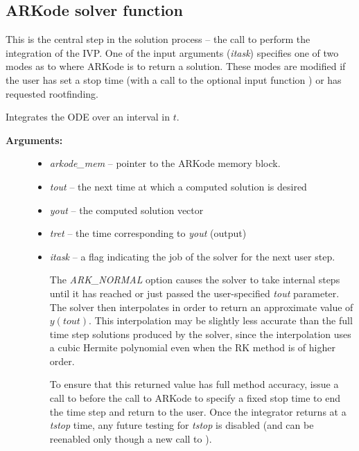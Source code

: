 \documentclass[letterpaper,10pt,english]{sphinxmanual}
\begin{document}
\subsection{ARKode solver function}
\label{c_interface/User_callable:arkode-solver-function}\label{c_interface/User_callable:cinterface-integration}
This is the central step in the solution process -- the call to perform
the integration of the IVP.  One of the input arguments (\emph{itask})
specifies one of two modes as to where ARKode is to return a
solution.  These modes are modified if the user has set a stop time
(with a call to the optional input function {\hyperref[c_interface/User_callable:c.ARKodeSetStopTime]{\emph{}}}) or
has requested rootfinding.

\begin{fulllineitems}
\label{c_interface/User_callable:c.ARKode}
Integrates the ODE over an interval in \(t\).
\begin{description}
\item[{\textbf{Arguments:}}] \leavevmode\begin{itemize}
\item {} 
\emph{arkode\_mem} -- pointer to the ARKode memory block.

\item {} 
\emph{tout} -- the next time at which a computed solution is desired

\item {} 
\emph{yout} -- the computed solution vector

\item {} 
\emph{tret} -- the time corresponding to \emph{yout} (output)

\item {} 
\emph{itask} -- a flag indicating the job of the solver for the next
user step.

The \emph{ARK\_NORMAL} option causes the solver to take internal steps
until it has reached or just passed the user-specified \emph{tout}
parameter. The solver then interpolates in order to return an
approximate value of \(y(tout)\).  This interpolation may be
slightly less accurate than the full time step solutions
produced by the solver, since the interpolation uses a cubic
Hermite polynomial even when the RK method is of higher order.

To ensure that this returned value has full method accuracy,
issue a call to {\hyperref[c_interface/User_callable:c.ARKodeSetStopTime]{\emph{}}} before the call
to ARKode to specify a fixed stop time to end the time step
and return to the user.  Once the integrator returns at a
\emph{tstop} time, any future testing for \emph{tstop} is disabled (and
can be reenabled only though a new call to
{\hyperref[c_interface/User_callable:c.ARKodeSetStopTime]{\emph{}}}).


\end{itemize}
\end{description}
\end{fulllineitems}
\end{document}
